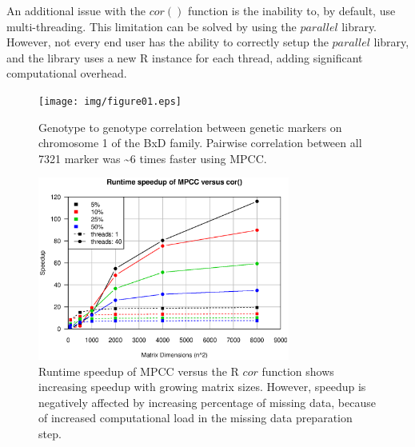 \documentclass{bioinfo}
\begin{document}
An additional issue with the $cor()$ function is the inability to, by default, use 
multi-threading. This limitation can be solved by using the $parallel$ library. 
However, not every end user has the ability to correctly setup the $parallel$ 
library, and the library uses a new R instance for each thread, adding significant 
computational overhead.
\vspace*{-5mm}
\begin{figure}[!t]
  \centerline{\texttt{[image: img/figure01.eps]}}
  \vspace*{-7mm}
  \caption{
    Genotype to genotype correlation between genetic markers on chromosome 
    1 of the BxD family. Pairwise correlation between all 7321 marker was \textasciitilde{}6 times 
    faster using MPCC.
  }
  \label{fig:fig1}
  \vspace*{-5mm}
\end{figure}
\begin{figure}[!t]
  \centerline{\includegraphics[width=235pt]{img/figure02.eps}}
  \vspace*{-7mm}
  \caption{
    Runtime speedup of MPCC versus the R $cor$ function shows 
    increasing speedup with growing matrix sizes. However, 
    speedup is negatively affected by increasing percentage of 
    missing data, because of increased computational load in the 
    missing data preparation step.
  }
  \label{fig:fig2}
  \vspace*{-5mm}
\end{figure}
\end{document}

